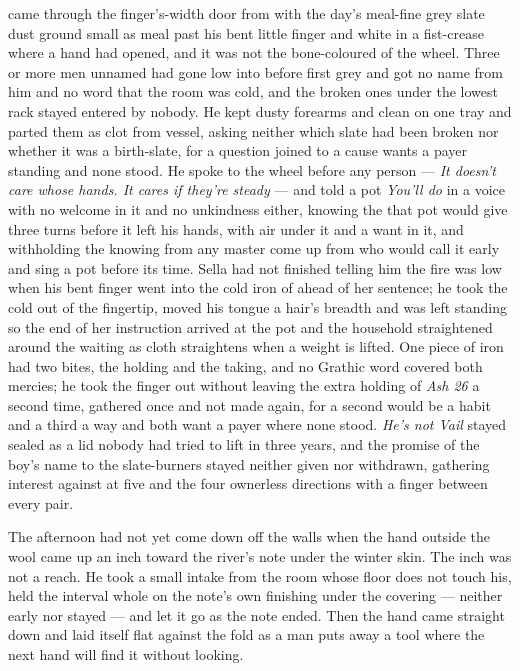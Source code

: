  came through the finger's-width door from  with the day's meal-fine grey slate dust ground small as meal past his bent little finger and white in a fist-crease where a hand had opened, and it was not the bone-coloured  of the wheel. Three or more men unnamed had gone low into  before first grey and got no name from him and no word that the room was cold, and the broken ones under the lowest rack stayed entered by nobody. He kept dusty forearms and clean on one tray and parted them as clot from vessel, asking neither which slate had been broken nor whether it was a birth-slate, for a question joined to a cause wants a payer standing and none stood. He spoke to the wheel before any person --- \emph{It doesn't care whose hands. It cares if they're steady} --- and told a pot \emph{You'll do} in a voice with no welcome in it and no unkindness either, knowing the  that pot would give three turns before it left his hands, with air under it and a want in it, and withholding the knowing from any master come up from  who would call it early and sing a pot before its time. Sella had not finished telling him the fire was low when his bent finger went into the cold iron of  ahead of her sentence; he took the cold out of the fingertip, moved his tongue a hair's breadth and was left standing so the end of her instruction arrived at the pot and the household straightened around the waiting as cloth straightens when a weight is lifted. One piece of iron had two bites, the holding and the taking, and no Grathic word covered both mercies; he took the finger out without leaving the extra holding of \emph{Ash 26} a second time, gathered once and not made again, for a second would be a habit and a third a way and both want a payer where none stood. \emph{He's not Vail} stayed sealed as a lid nobody had tried to lift in three years, and the promise of the boy's name to the slate-burners stayed neither given nor withdrawn, gathering interest against  at five and the four ownerless directions with a finger between every pair.

The afternoon had not yet come down off the walls when the hand outside the wool came up an inch toward the river's note under the winter skin. The inch was not a reach. He took a small intake from the room whose floor does not touch his, held the interval whole on the note's own finishing under the covering --- neither early nor stayed --- and let it go as the note ended. Then the hand came straight down and laid itself flat against the fold as a man puts away a tool where the next hand will find it without looking.

